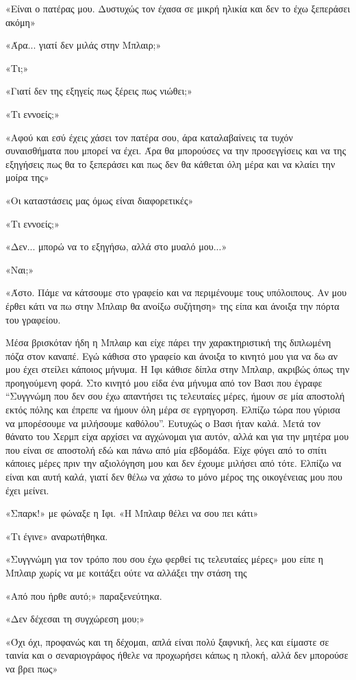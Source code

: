 \documentclass[12pt,twoside, openany]{book}
\begin{document}
«Είναι ο πατέρας μου. Δυστυχώς τον έχασα σε μικρή ηλικία και δεν το έχω ξεπεράσει ακόμη»

«Άρα... γιατί δεν μιλάς στην Μπλαιρ;»

«Τι;»

«Γιατί δεν της εξηγείς πως ξέρεις πως νιώθει;»

«Τι εννοείς;»

«Αφού και εσύ έχεις χάσει τον πατέρα σου, άρα καταλαβαίνεις τα τυχόν συναισθήματα που μπορεί να έχει. Άρα θα μπορούσες να την προσεγγίσεις και να της εξηγήσεις πως θα το ξεπεράσει και πως δεν θα κάθεται όλη μέρα και να κλαίει την μοίρα της»

«Οι καταστάσεις μας  όμως είναι διαφορετικές»

«Τι εννοείς;»

«Δεν... μπορώ να το εξηγήσω, αλλά στο μυαλό μου...»

«Ναι;»

«Άστο. Πάμε να κάτσουμε στο γραφείο και να περιμένουμε τους υπόλοιπους. Αν μου έρθει κάτι να πω στην Μπλαιρ θα ανοίξω συζήτηση» της είπα και άνοιξα την πόρτα του γραφείου.

Μέσα βρισκόταν ήδη η Μπλαιρ και είχε πάρει την χαρακτηριστική της διπλωμένη πόζα στον καναπέ. Εγώ κάθισα στο γραφείο και άνοιξα το κινητό μου για να δω αν μου έχει στείλει κάποιος μήνυμα. Η Ιφι κάθισε δίπλα στην Μπλαιρ, ακριβώς όπως την προηγούμενη φορά. Στο κινητό μου είδα ένα μήνυμα από τον Βασι που έγραφε “Συγγνώμη που δεν σου έχω απαντήσει τις τελευταίες μέρες, ήμουν σε μία αποστολή εκτός πόλης και έπρεπε να ήμουν όλη μέρα σε εγρηγορση. Ελπίζω τώρα που γύρισα να μπορέσουμε να μιλήσουμε καθόλου”. Ευτυχώς ο Βασι ήταν καλά. Μετά τον θάνατο του Χερμπ είχα αρχίσει να αγχώνομαι για αυτόν, αλλά και για την μητέρα μου που είναι σε αποστολή εδώ και πάνω από μία εβδομάδα. Είχε φύγει από το σπίτι κάποιες μέρες πριν την αξιολόγηση μου και δεν έχουμε μιλήσει από τότε. Ελπίζω να είναι και αυτή καλά, γιατί δεν θέλω να χάσω το μόνο μέρος της οικογένειας μου που έχει μείνει.

«Σπαρκ!» με φώναξε η Ιφι. «Η Μπλαιρ θέλει να σου πει κάτι» 

«Τι έγινε» αναρωτήθηκα.

«Συγγνώμη για τον τρόπο που σου έχω φερθεί τις τελευταίες μέρες» μου είπε η Μπλαιρ χωρίς να με κοιτάξει ούτε να αλλάξει την στάση της

«Από που ήρθε αυτό;» παραξενεύτηκα.

«Δεν δέχεσαι τη συγχώρεση μου;»

«Όχι όχι, προφανώς και τη δέχομαι, απλά είναι πολύ ξαφνική, λες και είμαστε σε ταινία και ο σεναριογράφος ήθελε να προχωρήσει κάπως η πλοκή, αλλά δεν μπορούσε να βρει πως»
\end{document}
